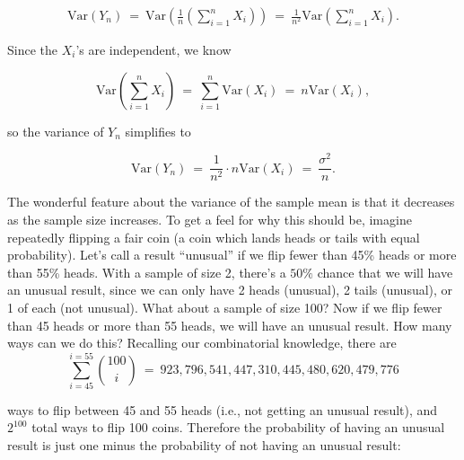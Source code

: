 \begin{eqnarray}

\textrm{Var}\left(Y_n\right)\ = \ \textrm{Var}\left(\frac{1}{n}\left(\sum_{i=1}^{n} X_{i}\right)\right) \ = \ \frac{1}{n^{2}}\textrm{Var}\left(\sum_{i=1}^{n} X_{i}\right).

\end{eqnarray}

Since the $X_{i}$'s are independent, we know

\begin{equation*}

\textrm{Var}\left(\sum_{i=1}^{n} X_{i}\right)\ = \ \sum_{i=1}^{n}\textrm{Var}(X_{i})\ = \ n\textrm{Var}(X_i),

\end{equation*}

so the variance of $Y_n$ simplifies to

\begin{equation*}

\textrm{Var}\left(Y_n\right)\ = \ \frac{1}{n^{2}}\cdot n\textrm{Var}(X_i)\ = \ \frac{\sigma^{2}}{n}.

\end{equation*}



The wonderful feature about the variance of the sample mean is that it decreases as the sample size increases. To get a feel for why this should be, imagine repeatedly flipping a fair coin (a coin which lands heads or tails with equal probability). Let's call a result ``unusual'' if we flip fewer than 45\% heads or more than 55\% heads.  With a sample of size 2, there's a $50\%$ chance that we will have an unusual result, since we can only have 2 heads (unusual), 2 tails (unusual), or 1 of each (not unusual). What about a sample of size 100? Now if we flip fewer than 45 heads or more than  55 heads, we will have an unusual result. How many ways can we do this? Recalling our combinatorial knowledge, there are \begin{equation*}

\sum_{i=45}^{i=55}{100 \choose i} \ = \ 923,796,541,447,310,445,480,620,479,776

\end{equation*}

ways to flip between 45 and 55 heads (i.e., not getting an unusual result), and $2^{100}$ total ways to flip 100 coins. Therefore the probability of having an unusual result is just one minus the probability of not having an unusual result:

